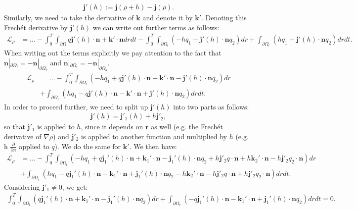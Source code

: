 \documentclass[11pt, a4paper]{article}
\theoremstyle{definition}
\newcommand{\n}{\mathbf{n}}
\newcommand{\jf}{\mathbf j}
\begin{document}
	\begin{align*}
		\jf'(h) := \jf (\rho + h) - \jf (\rho).
	\end{align*}
	Similarly, we need to take the derivative of $\mathbf k$ and denote it by $\mathbf{k}'$.
	Denoting this Frech\'et derivative by $\jf'(h)$ we can write out further terms as follows:
	\begin{align*}
		\mathcal{L}_\rho &= ... - \int_0^T \int_{\partial \Omega} q \jf'(h)   \cdot \n + \mathbf{k}' \cdot \n dr dt - \int_0^T \int_{\partial \Omega_l} \left(- h q_1 - \jf'(h)  \cdot \n q_2 \right)   dr  + \int_{\partial \Omega_r} \left(h q_1 + \jf'(h)  \cdot \n q_2 \right)   dr dt. 
	\end{align*}
	When writing out the terms explicitly we pay attention to the fact that $\n|_{\partial \Omega_l} = - \n|_{\partial \Omega_r}$ and $\n|_{\partial \Omega_t} = - \n|_{\partial \Omega_b}$.
	\begin{align*}
		\mathcal{L}_\rho &= ... - \int_0^T \int_{\partial \Omega_l} \left(- h q_1 + q \jf'(h)   \cdot \n  + \mathbf{k}' \cdot \n- \jf'(h)  \cdot \n q_2 \right)   dr  \\
		&+ \int_{\partial \Omega_r} \left(h q_1 - q \jf'(h)   \cdot \n - \mathbf{k}' \cdot \n+ \jf'(h)  \cdot \n q_2 \right)   dr dt .
	\end{align*}
	In order to proceed further, we need to split up $\jf'(h)$ into two parts as follows:
	\begin{align*}
		\jf'(h) = \jf'_1(h) + h \jf'_2,
	\end{align*}
	so that $\jf'_1$ is applied to $h$, since it depends on $\mathbf{r}$ as well (e.g. the Frech\'et derivative of $\nabla \rho$) and $\jf'_2$ is applied to another function and multiplied by $h$ (e.g. h $\frac{\partial }{\partial n}$ applied to $q$). We do the same for $\mathbf k'$.
	We then have:
	\begin{align*}
		\mathcal{L}_\rho &= ... - \int_0^T \int_{\partial \Omega_l} \left(- h q_1 + q \jf_1'(h)   \cdot \n + \mathbf{k}_1' \cdot \n - \jf_1'(h)  \cdot \n q_2  + h \jf'_2 q \cdot \n + h \mathbf{k}_2' \cdot \n-  h \jf'_2 q_2 \cdot \n \right)   dr  \\
		&+ \int_{\partial \Omega_r} \left( h q_1 - q \jf_1'(h)   \cdot \n -\mathbf{k}_1' \cdot \n+ \jf_1'(h)  \cdot \n q_2 - h\mathbf{k}_2' \cdot \n - h \jf'_2 q \cdot \n +  h \jf'_2 q_2 \cdot \n \right)   dr dt.
	\end{align*}
	Considering $\jf'_1 \neq 0$, we get:
	\begin{align*}
		\int_0^T \int_{\partial \Omega_l} \left( q \jf_1'(h)   \cdot \n  + \mathbf{k}_1' \cdot \n - \jf_1'(h)  \cdot \n q_2  \right)   dr  + \int_{\partial \Omega_r} \left(-q \jf_1'(h)   \cdot \n - \mathbf{k}_1' \cdot \n + \jf_1'(h)  \cdot \n q_2  \right)   dr dt = 0 .
	\end{align*}
\end{document}
